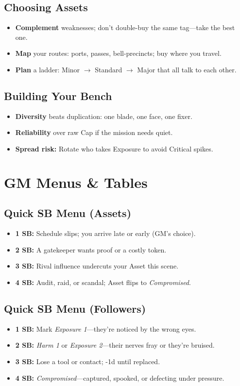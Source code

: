 \subsection*{Choosing Assets}
\begin{itemize}
  \item \textbf{Complement} weaknesses; don't double-buy the same tag—take the best one.
  \item \textbf{Map} your routes: ports, passes, bell-precincts; buy where you travel.
  \item \textbf{Plan} a ladder: Minor \(\rightarrow\) Standard \(\rightarrow\) Major that all talk to each other.
\end{itemize}

\subsection*{Building Your Bench}
\begin{itemize}
  \item \textbf{Diversity} beats duplication: one blade, one face, one fixer.
  \item \textbf{Reliability} over raw Cap if the mission needs quiet.
  \item \textbf{Spread risk:} Rotate who takes Exposure to avoid Critical spikes.
\end{itemize}

\section{GM Menus \& Tables}
\subsection*{Quick SB Menu (Assets)}
\begin{itemize}
  \item \textbf{1 SB:} Schedule slips; you arrive late or early (GM's choice).
  \item \textbf{2 SB:} A gatekeeper wants proof or a costly token.
  \item \textbf{3 SB:} Rival influence undercuts your Asset this scene.
  \item \textbf{4 SB:} Audit, raid, or scandal; Asset flips to \emph{Compromised}.
\end{itemize}

\subsection*{Quick SB Menu (Followers)}
\begin{itemize}
  \item \textbf{1 SB:} Mark \emph{Exposure 1}—they're noticed by the wrong eyes.
  \item \textbf{2 SB:} \emph{Harm 1} or \emph{Exposure 2}—their nerves fray or they're bruised.
  \item \textbf{3 SB:} Lose a tool or contact; -1d until replaced.
  \item \textbf{4 SB:} \emph{Compromised}—captured, spooked, or defecting under pressure.
\end{itemize}

